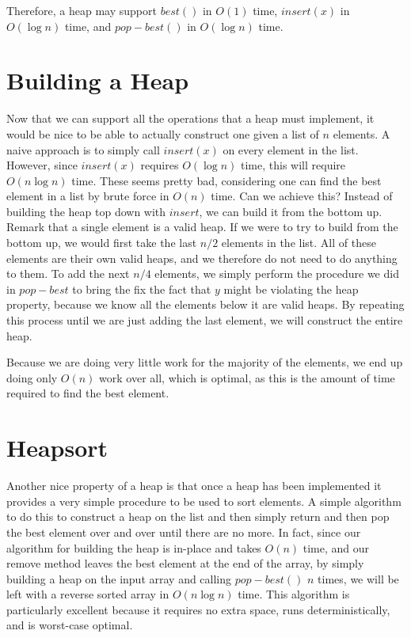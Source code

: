 Therefore, a heap may support $best()$ in $O(1)$ time, $insert(x)$ 
in $O(\log n)$ time, and $pop-best()$ in $O(\log n)$ time.

\section{Building a Heap}

Now that we can support all the operations that a heap must implement,
it would be nice to be able to actually construct one given a list of $n$
elements. A naive approach is to simply call $insert(x)$ on every element
in the list. However, since $insert(x)$ requires $O(\log n)$ time, this will
require $O(n \log n)$ time. These seems pretty bad, considering one can find
the best element in a list by brute force in $O(n)$ time. Can we achieve this?
Instead of building the heap top down with $insert$, we can build it from the
bottom up. Remark that a single element is a valid heap. If we were to try to
build from the bottom up, we would first take the last $n/2$ elements in the
list. All of these elements are their own valid heaps, and we therefore do not
need to do anything to them. To add the next $n/4$ elements, we simply perform
the procedure we did in $pop-best$ to bring the fix the fact that $y$ might
be violating the heap property, because we know all the elements below it are
valid heaps. By repeating this process until we are just adding the last
element, we will construct the entire heap. 

Because we are doing very little work for the majority of the elements, we end
up doing only $O(n)$ work over all, which is optimal, as this is the amount of
time required to find the best element.

\section{Heapsort}

Another nice property of a heap is that once a heap has been implemented
it provides a very simple procedure to be used to sort elements.
A simple algorithm to do this to construct a heap on the list and then simply
return and then pop the best element over and over until there are no more.
In fact, since our algorithm for building the heap is in-place and takes $O(n)$
time, and our remove method leaves the best element at the end of the array,
by simply building a heap on the input array and calling $pop-best()$ $n$ times,
we will be left with a reverse sorted array in $O(n \log n)$ time. 
This algorithm is particularly excellent because it requires no extra space,
runs deterministically, and is worst-case optimal.

